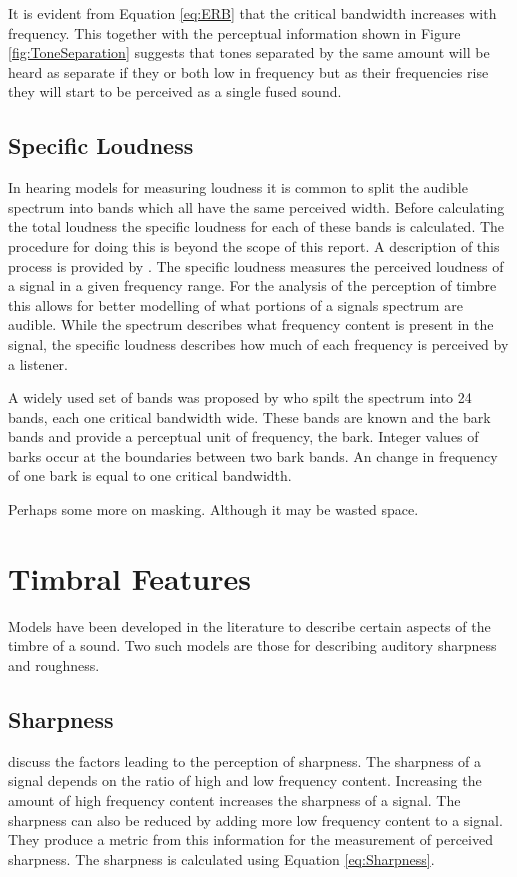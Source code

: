 		It is evident from Equation \ref{eq:ERB} that the critical bandwidth increases with frequency. This together
		with the perceptual information shown in Figure \ref{fig:ToneSeparation} suggests that tones separated by
		the same amount will be heard as separate if they or both low in frequency but as their frequencies rise
		they will start to be perceived as a single fused sound.

	\subsection{Specific Loudness}
	\label{sec:Timbre-PsychoacousticPrinciples-SpecificLoudness}
		In hearing models for measuring loudness it is common to split the audible spectrum into bands which all
		have the same perceived width. Before calculating the total loudness the specific loudness for each of these
		bands is calculated. The procedure for doing this is beyond the scope of this report. A description of this
		process is provided by \citet{moore2997a}. The specific loudness measures the perceived loudness of a signal
		in a given frequency range. For the analysis of the perception of timbre this allows for better modelling of
		what portions of a signals spectrum are audible. While the spectrum describes what frequency content is
		present in the signal, the specific loudness describes how much of each frequency is perceived by a
		listener.

		A widely used set of bands was proposed by \citet{zwicker1961subdivision} who spilt the spectrum into 24
		bands, each one critical bandwidth wide. These bands are known and the bark bands and provide a perceptual
		unit of frequency, the bark. Integer values of barks occur at the boundaries between two bark bands. An
		change in frequency of one bark is equal to one critical bandwidth.

	\note
	{
		Perhaps some more on masking. Although it may be wasted space.
	}

\section{Timbral Features}
\label{sec:Timbre-TimbralFeatures}
	Models have been developed in the literature to describe certain aspects of the timbre of a sound. Two such models
	are those for describing auditory sharpness and roughness.
	
	\subsection{Sharpness}
		\citet{fastl2007psychoacoustics} discuss the factors leading to the perception of sharpness. The sharpness
		of a signal depends on the ratio of high and low frequency content. Increasing the amount of high frequency
		content increases the sharpness of a signal. The sharpness can also be reduced by adding more low frequency
		content to a signal. They produce a metric from this information for the measurement of perceived sharpness.
		The sharpness is calculated using Equation \ref{eq:Sharpness}.

